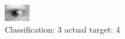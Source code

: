 \begin{figure}[h!]
\begin{center}
\includegraphics[width=0.60\columnwidth]{figures/ID688_class_3_target_4.png}
\end{center}
\caption{ Classification: 3 actual target: 4}
\label{fig:ID688_class_3_target_4}
\end{figure}
